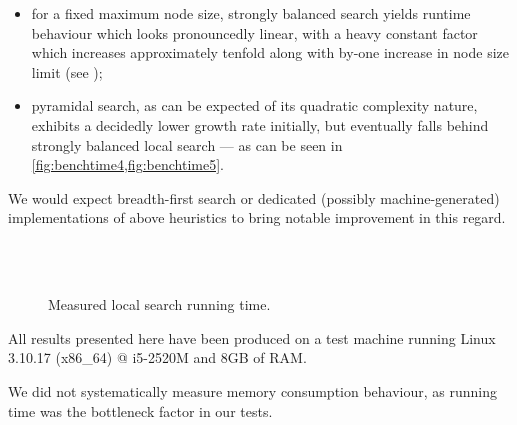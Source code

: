 \documentclass[index=totoc,bibliography=totoc]{scrartcl}
\numberwithin{equation}{section}
\numberwithin{figure}{section}
\numberwithin{table}{section}
\begin{document}
\begin{itemize}
  \item
    for a fixed maximum node size, strongly balanced search yields runtime
    behaviour which looks pronouncedly linear, with a heavy constant
    factor which increases approximately tenfold along with
    by-one increase in node size limit
    (see );
  \item
    pyramidal search, as can be expected of its quadratic complexity
    nature, exhibits a decidedly lower growth rate initially, but eventually
    falls behind strongly balanced local search --- as can be seen
    in \cref{fig:benchtime4,fig:benchtime5}.
\end{itemize}

We would expect breadth-first search or dedicated (possibly
machine-generated) implementations of above heuristics to bring
notable improvement in this regard.

\begin{figure}[htbp]
\centering
  \null\hfill%
  \hfill\null
  \null\hfill%
  \hfill\null\\
  \null\hfill%
  \hfill\null\\
  \null\hfill%
  \hfill\null
  \null\hfill%
  \hfill\null
\caption{Measured local search running time.}
\label{fig:benchTIME}
\end{figure}

All results presented here have been produced on a test machine running
Linux 3.10.17 ({\ttfamily x86\_64}) @ i5-2520M and 8GB of RAM.

We did not systematically measure memory consumption behaviour, as running
time was the bottleneck factor in our tests.
\end{document}
